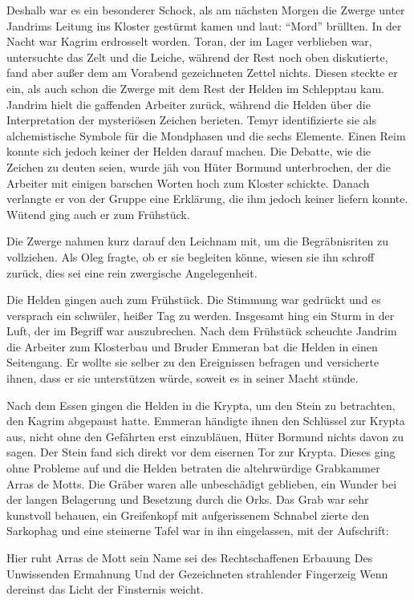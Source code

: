 Deshalb war es ein besonderer Schock, als am nächsten Morgen die Zwerge unter Jandrims Leitung ins Kloster gestürmt kamen und laut: ``Mord'' brüllten. In der Nacht war Kagrim erdrosselt worden. Toran, der im Lager verblieben war, untersuchte das Zelt und die Leiche, während der Rest noch oben diskutierte, fand aber außer dem am Vorabend gezeichneten Zettel nichts. Diesen steckte er ein, als auch schon die Zwerge mit dem Rest der Helden im Schlepptau kam. Jandrim hielt die gaffenden Arbeiter zurück, während die Helden über die Interpretation der mysteriösen Zeichen berieten. Temyr identifizierte sie als alchemistische Symbole für die Mondphasen und die sechs Elemente. Einen Reim konnte sich jedoch keiner der Helden darauf machen. Die Debatte, wie die Zeichen zu deuten seien, wurde jäh von Hüter Bormund unterbrochen, der die Arbeiter mit einigen barschen Worten hoch zum Kloster schickte. Danach verlangte er von der Gruppe eine Erklärung, die ihm jedoch keiner liefern konnte. Wütend ging auch er zum Frühstück.

Die Zwerge nahmen kurz darauf den Leichnam mit, um die Begräbnisriten zu vollziehen. Als Oleg fragte, ob er sie begleiten könne, wiesen sie ihn schroff zurück, dies sei eine rein zwergische Angelegenheit.

Die Helden gingen auch zum Frühstück. Die Stimmung war gedrückt und es versprach ein schwüler, heißer Tag zu werden. Insgesamt hing ein Sturm in der Luft, der im Begriff war auszubrechen. Nach dem Frühstück scheuchte Jandrim die Arbeiter zum Klosterbau und Bruder Emmeran bat die Helden in einen Seitengang. Er wollte sie selber zu den Ereignissen befragen und versicherte ihnen, dass er sie unterstützen würde, soweit es in seiner Macht stünde.

Nach dem Essen gingen die Helden in die Krypta, um den Stein zu betrachten, den Kagrim abgepaust hatte. Emmeran händigte ihnen den Schlüssel zur Krypta aus, nicht ohne den Gefährten erst einzubläuen, Hüter Bormund nichts davon zu sagen. Der Stein fand sich direkt vor dem eisernen Tor zur Krypta. Dieses ging ohne Probleme auf und die Helden betraten die altehrwürdige Grabkammer Arras de Motts. Die Gräber waren alle unbeschädigt geblieben, ein Wunder bei der langen Belagerung und Besetzung durch die Orks. Das Grab war sehr kunstvoll behauen, ein Greifenkopf mit aufgerissenem Schnabel zierte den Sarkophag und eine steinerne Tafel war in ihn eingelassen, mit der Aufschrift:


Hier ruht Arras de Mott\newline
sein Name sei des Rechtschaffenen Erbauung\newline
Des Unwissenden Ermahnung\newline
Und der Gezeichneten strahlender Fingerzeig\newline
Wenn dereinst\newline
das Licht der Finsternis weicht.

